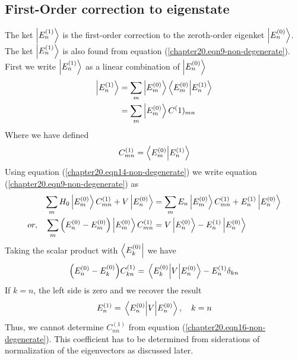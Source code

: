 \subsection{First-Order correction to eigenstate}
The ket $\ket{E_{n}^{(1)}}$ is the first-order correction to the zeroth-order eigenket $\ket{E_{n}^{(0)}}$. The ket $\ket{E_{n}^{(1)}}$ is also found from equation (\ref{chapter20.eqn9-non-degenerate}). First we write $\ket{E_{n}^{(1)}}$ as a linear combination of $\ket{E_{n}^{(0)}}$
\begin{align}
\label{chapter20.eqn13-non-degenerate}
\ket{E_{n}^{(1)}} 
&= \sum_{m} \ket{E_{m}^{(0)}} \braket{E_m^{(0)}}{E_n^{(1)}} \\
\label{chapter20.eqn14-non-degenerate}
&= \sum_{m} \ket{E_{m}^{(0)}} C^(1)_{m n}
\end{align}
Where we have defined
\begin{equation}
C^{(1)}_{m n} = \braket{E_m^{(0)}}{E_n^{(1)}}
\label{chapter20.eqn15-non-degenerate}
\end{equation}
Using equation (\ref{chapter20.eqn14-non-degenerate}) we write equation (\ref{chapter20.eqn9-non-degenerate}) as
\begin{align*}
	\sum_{m} H_0 \ket{E_{m}^{(0)}} C^{(1)}_{m n} + V \ket{E_{n}^{(0)}} 
	&= \sum_{m} E_n \ket{E_{m}^{(0)}} C^{(1)}_{m n} + E_{n}^{(1)} \ket{E_{n}^{(0)}} \\
	or, \quad 
	\sum_{m} \qty(E_{n}^{(0)}  -  E_{m}^{(0)}) \ket{E_{m}^{(0)}} C^{(1)}_{m n} 
	&= V \ket{E_n^{(0)}} - E_{n}^{(1)} \ket{E_{n}^{(0)}}
\end{align*}
Taking the scalar product with $\bra{E_k^{(0)}}$ we have
\begin{equation}
\qty(E_n^{(0)} - E_k^{(0)}) C^{(1)}_{k n} = \matrixel{E_k^{(0)}} {V} {E_n^{(0)}} - E_n^{(1)} \delta_{k n}
\label{chapter20.eqn16-non-degenerate}
\end{equation}
If $k=n$, the left side is zero and we recover the result
\begin{equation}
E_n^{(1)}  = \matrixel{E_n^{(0)}} {V} {E_n^{(0)}} , \quad k = n
\end{equation}
Thus, we cannot determine $C^{(1)}_{n n}$ from equation (\ref{chapter20.eqn16-non-degenerate}). This coefficient has to be determined from siderations of normalization of the eigenvectors as discussed later.\\

